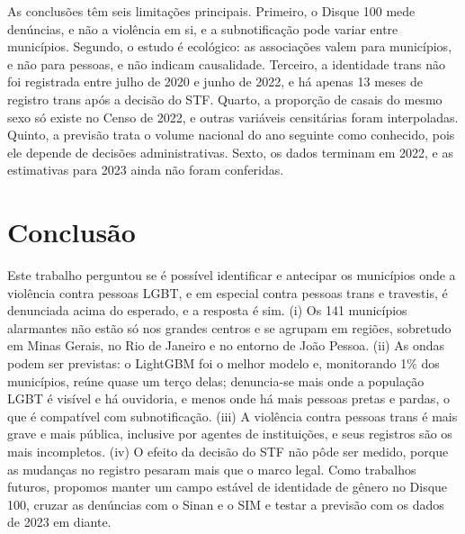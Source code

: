 \documentclass[12pt]{article}
\begin{document}
As conclusões têm seis limitações principais. Primeiro, o Disque 100 mede denúncias, e não a violência em si, e a subnotificação pode variar entre municípios. Segundo, o estudo é ecológico: as associações valem para municípios, e não para pessoas, e não indicam causalidade. Terceiro, a identidade trans não foi registrada entre julho de 2020 e junho de 2022, e há apenas 13 meses de registro trans após a decisão do STF. Quarto, a proporção de casais do mesmo sexo só existe no Censo de 2022, e outras variáveis censitárias foram interpoladas. Quinto, a previsão trata o volume nacional do ano seguinte como conhecido, pois ele depende de decisões administrativas. Sexto, os dados terminam em 2022, e as estimativas para 2023 ainda não foram conferidas.


\section{Conclusão}
\label{sec:conclusao}

Este trabalho perguntou se é possível identificar e antecipar os municípios onde a violência contra pessoas LGBT, e em especial contra pessoas trans e travestis, é denunciada acima do esperado, e a resposta é sim. (i) Os 141 municípios alarmantes não estão só nos grandes centros e se agrupam em regiões, sobretudo em Minas Gerais, no Rio de Janeiro e no entorno de João Pessoa. (ii) As ondas podem ser previstas: o LightGBM foi o melhor modelo e, monitorando 1\% dos municípios, reúne quase um terço delas; denuncia-se mais onde a população LGBT é visível e há ouvidoria, e menos onde há mais pessoas pretas e pardas, o que é compatível com subnotificação. (iii) A violência contra pessoas trans é mais grave e mais pública, inclusive por agentes de instituições, e seus registros são os mais incompletos. (iv) O efeito da decisão do STF não pôde ser medido, porque as mudanças no registro pesaram mais que o marco legal. Como trabalhos futuros, propomos manter um campo estável de identidade de gênero no Disque 100, cruzar as denúncias com o Sinan e o SIM e testar a previsão com os dados de 2023 em diante.




\end{document}
